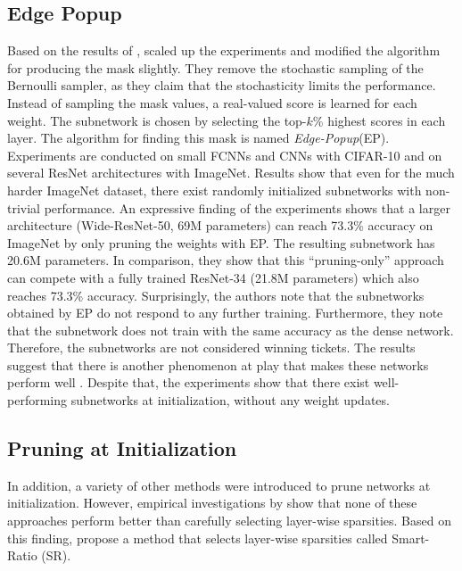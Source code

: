\subsection{Edge Popup}
Based on the results of \autocite{Supermasks}, \textcite{EdgePopup} scaled up the experiments and modified the algorithm for producing the mask slightly.
They remove the stochastic sampling of the Bernoulli sampler, as they claim that the stochasticity limits the performance. 
Instead of sampling the mask values, a real-valued score is learned for each weight. 
The subnetwork is chosen by selecting the top-$k$\% highest scores in each layer.
The algorithm for finding this mask is named \textit{Edge-Popup}(EP).
Experiments are conducted on small FCNNs and CNNs with CIFAR-10 and on several ResNet architectures with ImageNet.
Results show that even for the much harder ImageNet dataset, there exist randomly initialized subnetworks with non-trivial performance. 
An expressive finding of the experiments shows that a larger architecture (Wide-ResNet-50, 69M parameters) can reach 73.3\% accuracy on ImageNet by only pruning the weights with EP.
The resulting subnetwork has 20.6M parameters. In comparison, they show that this “pruning-only” approach can compete with a fully trained ResNet-34 (21.8M parameters) which also reaches 73.3\% accuracy. 
Surprisingly, the authors note that the subnetworks obtained by EP do not respond to any further training.
Furthermore, they note that the subnetwork does not train with the same accuracy as the dense network.
Therefore, the subnetworks are not considered winning tickets.
The results suggest that there is another phenomenon at play that makes these networks perform well \autocite{EdgePopup}.
Despite that, the experiments show that there exist well-performing subnetworks at initialization, without any weight updates.

\subsection{Pruning at Initialization}
In addition, a variety of other methods \autocite{GraSP, SNIP, SynFlow} were introduced to prune networks at initialization. 
However, empirical investigations by \textcite{PruningAtInitMissingTheMark, SanityCheckingPruningMethods} show that none of these approaches perform better than carefully selecting layer-wise sparsities.
Based on this finding, \autocite{SanityCheckingPruningMethods} propose a method that selects layer-wise sparsities called Smart-Ratio (SR).

